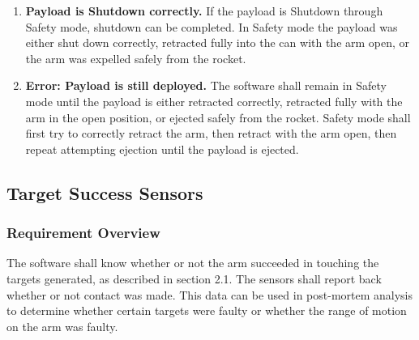 \documentclass[letterpaper,10pt]{article}
\begin{document}
\begin{center}
\begin{enumerate}
\item{\textbf{Payload is Shutdown correctly.} If the payload is Shutdown through Safety mode, shutdown can be completed. In Safety mode the payload was either shut down correctly, retracted fully into the can with the arm open, or the arm was expelled safely from the rocket.}
\item{\textbf{Error: Payload is still deployed.} The software shall remain in Safety mode until the payload is either retracted correctly, retracted fully with the arm in the open position, or ejected safely from the rocket. Safety mode shall first try to correctly retract the arm, then retract with the arm open, then repeat attempting ejection until the payload is ejected.}
\end{enumerate}
\end{center}

\subsection{Target Success Sensors}
\subsubsection{Requirement Overview}
The software shall know whether or not the arm succeeded in touching the targets generated, as described in section 2.1. The sensors
shall report back whether or not contact was made. This data can be used in post-mortem analysis to determine whether
certain targets were faulty or whether the range of motion on the arm was faulty.
\end{document}
